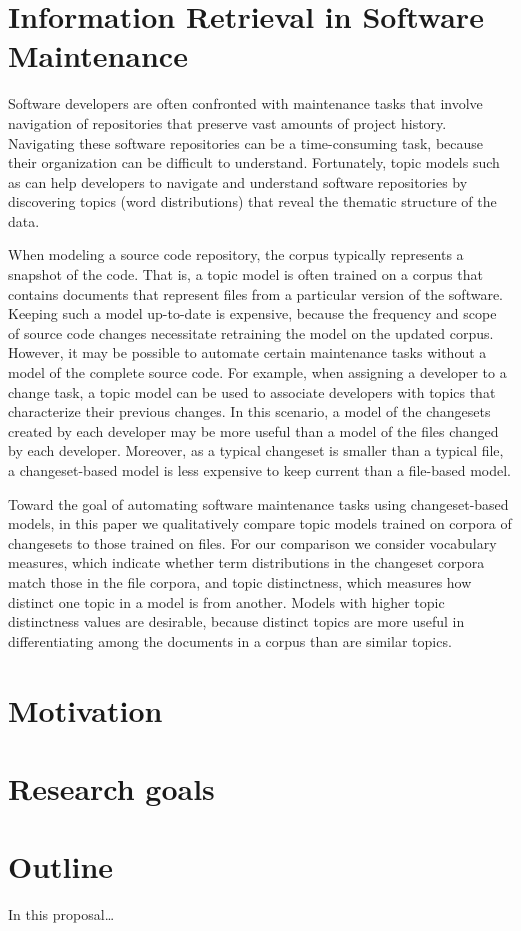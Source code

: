 \section{Information Retrieval in Software
Maintenance}\label{information-retrieval-in-software-maintenance}

Software developers are often confronted with maintenance tasks that
involve navigation of repositories that preserve vast amounts of project
history. Navigating these software repositories can be a time-consuming
task, because their organization can be difficult to understand.
Fortunately, topic models such as  can help developers to navigate and
understand software repositories by discovering topics (word
distributions) that reveal the thematic structure of the
data.

When modeling a source code repository, the corpus typically represents
a snapshot of the code. That is, a topic model is often trained on a
corpus that contains documents that represent files from a particular
version of the software. Keeping such a model up-to-date is expensive,
because the frequency and scope of source code changes necessitate
retraining the model on the updated corpus. However, it may be possible
to automate certain maintenance tasks without a model of the complete
source code. For example, when assigning a developer to a change task, a
topic model can be used to associate developers with topics that
characterize their previous changes. In this scenario, a model of the
changesets created by each developer may be more useful than a model of
the files changed by each developer. Moreover, as a typical changeset is
smaller than a typical file, a changeset-based model is less expensive
to keep current than a file-based model.

Toward the goal of automating software maintenance tasks using
changeset-based models, in this paper we qualitatively compare topic
models trained on corpora of changesets to those trained on files. For
our comparison we consider vocabulary measures, which indicate whether
term distributions in the changeset corpora match those in the file
corpora, and topic
distinctness,
which measures how distinct one topic in a model is from another. Models
with higher topic distinctness values are desirable, because distinct
topics are more useful in differentiating among the documents in a
corpus than are similar topics.

\section{Motivation}\label{motivation}

\section{Research goals}\label{research-goals}

\section{Outline}\label{outline}

In this proposal\ldots{}
